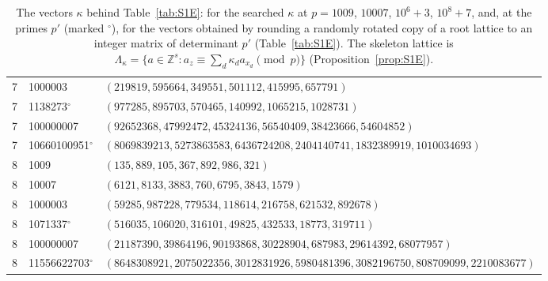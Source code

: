 \documentclass[11pt]{amsart}
\theoremstyle{definition}
\theoremstyle{plain}
\newcommand{\Z}{\mathbb{Z}}
\begin{document}
\begin{table}[tbp]
\begin{tabular}{@{}cll@{}}
7 & 1000003 & $(219819,595664,349551,501112,415995,657791)$\\
7 & 1138273${}^{\circ}$ & $(977285,895703,570465,140992,1065215,1028731)$\\
7 & 100000007 & $(92652368,47992472,45324136,56540409,38423666,54604852)$\\
7 & 10660100951${}^{\circ}$ & $(8069839213,5273863583,6436724208,2404140741,1832389919,1010034693)$\\
\midrule
8 & 1009 & $(135,889,105,367,892,986,321)$\\
8 & 10007 & $(6121,8133,3883,760,6795,3843,1579)$\\
8 & 1000003 & $(59285,987228,779534,118614,216758,621532,892678)$\\
8 & 1071337${}^{\circ}$ & $(516035,106020,316101,49825,432533,18773,319711)$\\
8 & 100000007 & $(21187390,39864196,90193868,30228904,687983,29614392,68077957)$\\
8 & 11556622703${}^{\circ}$ & $(8648308921,2075022356,3012831926,5980481396,3082196750,808709099,2210083677)$\\
\bottomrule
\end{tabular}
\medskip
\caption{The vectors $\kappa$ behind Table~\ref{tab:S1E}: for the searched $\kappa$ at $p=1009$, $10007$, $10^6{+}3$, $10^8{+}7$, and, at the primes $p'$ (marked ${}^\circ$), for the vectors obtained by rounding a randomly rotated copy of a root lattice to an integer matrix of determinant $p'$ (Table~\ref{tab:S1E}). The skeleton lattice is $\Lambda_\kappa=\{a\in\Z^s:a_z\equiv\sum_d\kappa_da_{x_d}\pmod p\}$ (Proposition~\ref{prop:S1E}).}
\label{tab:S1Ekappa}
\end{table}
\end{document}
